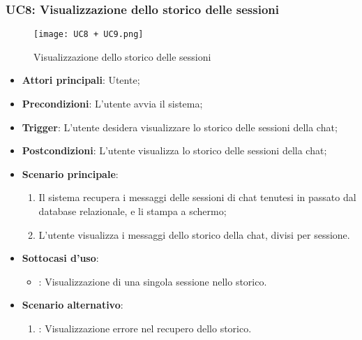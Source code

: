 \hypertarget{UC8}{}
\subsubsection{UC8: Visualizzazione dello storico delle sessioni}

\begin{figure}[h]
    \centering
    \texttt{[image: UC8 + UC9.png]}
    \caption{Visualizzazione dello storico delle sessioni}
\end{figure}

\begin{itemize}
    \item \textbf{Attori principali}: Utente;
    \item \textbf{Precondizioni}: L'utente avvia il sistema;
    \item \textbf{Trigger}: L'utente desidera visualizzare lo storico delle sessioni della chat;
    \item \textbf{Postcondizioni}: L'utente visualizza lo storico delle sessioni della chat;
    \item \textbf{Scenario principale}:
    \begin{enumerate}
        \item Il sistema recupera i messaggi delle sessioni di chat tenutesi in passato dal database relazionale, e li stampa a schermo;
        \item L'utente visualizza i messaggi dello storico della chat, divisi per sessione.
    \end{enumerate}
    \item \textbf{Sottocasi d'uso}:
    \begin{itemize}
        \item {}: Visualizzazione di una singola sessione nello storico.
    \end{itemize}
    \item \textbf{Scenario alternativo}:
    \begin{enumerate}
        \item {}: Visualizzazione errore nel recupero dello storico.
    \end{enumerate}
\end{itemize}

\hypertarget{UC8.1}{}
